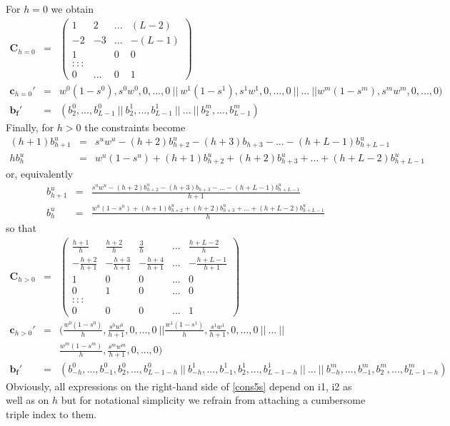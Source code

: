 \documentclass[a4paper]{book}
\begin{document}
For $h=0$ we obtain
\begin{eqnarray}\label{cons77s}
\mathbf{C}_{h=0}&=&\left(\begin{array}{ccccccccc}
1&2&...&(L-2)\\
-2&-3&...&-(L-1)\\
1&&0&0\\
:::\\
0&...&0&1
\end{array}\right)\\
\mathbf{c}_{h=0}'&=&w^0(1-s^0),s^0w^0,0,...,0~||~w^1(1-s^1),s^1w^1,0,...,0~||~...~||w^m(1-s^m),s^mw^m,0,...,0)\nonumber\\
\mathbf{b_f}'&=&(b_2^0,...,b_{L-1}^0~||~b_2^1,...,b_{L-1}^1~||~...~||~b_2^m,...,b_{L-1}^m)\nonumber
\end{eqnarray}
Finally, for $h>0$ the constraints become
\begin{eqnarray*}%
(h+1)b_{h+1}^u&=&s^uw^u-(h+2)b_{h+2}^u-(h+3)b_{h+3}-...-(h+L-1)b_{h+L-1}^u\nonumber\\
hb_{h}^u&=&w^u(1-s^u)+(h+1)b_{h+2}^u+(h+2)b_{h+3}^u+...+(h+L-2)b_{h+L-1}^u\nonumber%
\end{eqnarray*}
or, equivalently
\begin{eqnarray*}%
b_{h+1}^u&=&\frac{s^uw^u-(h+2)b_{h+2}^u-(h+3)b_{h+3}-...-(h+L-1)b_{h+L-1}^u}{h+1}\nonumber\\
b_{h}^u&=&\frac{w^u(1-s^u)+(h+1)b_{h+2}^u+(h+2)b_{h+3}^u+...+(h+L-2)b_{h+L-1}^u}{h}\nonumber%
\end{eqnarray*}
so that
\begin{eqnarray*}%
\mathbf{C}_{h> 0}&=&\left(\begin{array}{ccccc}
\displaystyle{\frac{h+1}{h}}&\displaystyle{\frac{h+2}{h}}&\displaystyle{\frac{3}{h}}&...&\displaystyle{\frac{h+L-2}{h}}\\
-\displaystyle{\frac{h+2}{h+1}}&-\displaystyle{\frac{h+3}{h+1}}&-\displaystyle{\frac{h+4}{h+1}}&...&-\displaystyle{\frac{h+L-1}{h+1}}\\
1&0&0&...&0\\
0&1&0&...&0\\
:::\\
0&0&0&...&1
\end{array}\right)\nonumber\\
\mathbf{c}_{h> 0}'&=&(\displaystyle{\frac{w^0(1-s^0)}{h}},\displaystyle{\frac{s^0w^0}{h+1}},0,...,0~||\displaystyle{\frac{w^1(1-s^1)}{h}},\displaystyle{\frac{s^1w^1}{h+1}},0,...,0~||~...~||\\
&&\displaystyle{\frac{w^m(1-s^m)}{h}},\displaystyle{\frac{s^mw^m}{h+1}},0,...,0)\nonumber\\
\mathbf{b_f}'&=&(b_{-h}^0,...,b_{-1}^0,b_2^0,...,b_{L-1-h}^0~||~b_{-h}^1,...,b_{-1}^1,b_2^1,...,b_{L-1-h}^1~||~...~||~b_{-h}^m,...,b_{-1}^m,b_2^m,...,b_{L-1-h}^m)\nonumber
\end{eqnarray*}
Obviously, all expressions on the right-hand side of \ref{cons5s} depend on i1, i2 as well as on $h$ but for notational simplicity we refrain from attaching a cumbersome triple index to them. 
\end{document}

